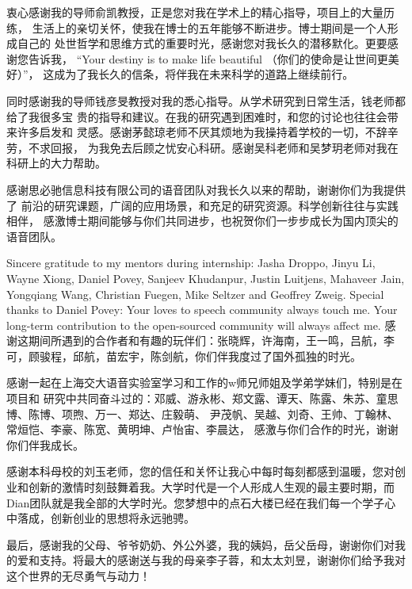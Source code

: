 \begin{thanks}

衷心感谢我的导师俞凯教授，正是您对我在学术上的精心指导，项目上的大量历练，
生活上的亲切关怀，使我在博士的五年能够不断进步。博士期间是一个人形成自己的
处世哲学和思维方式的重要时光，感谢您对我长久的潜移默化。更要感谢您告诉我， 
“Your destiny is to make life beautiful （你们的使命是让世间更美好）”， 
这成为了我长久的信条，将伴我在未来科学的道路上继续前行。

同时感谢我的导师钱彦旻教授对我的悉心指导。从学术研究到日常生活，钱老师都给了我很多宝
贵的指导和建议。在我的研究遇到困难时，和您的讨论也往往会带来许多启发和
灵感。感谢茅懿琼老师不厌其烦地为我操持着学校的一切，不辞辛劳，不求回报，
为我免去后顾之忧安心科研。感谢吴科老师和吴梦玥老师对我在科研上的大力帮助。

感谢思必驰信息科技有限公司的语音团队对我长久以来的帮助，谢谢你们为我提供了
前沿的研究课题，广阔的应用场景，和充足的研究资源。科学创新往往与实践相伴，
感激博士期间能够与你们共同进步，也祝贺你们一步步成长为国内顶尖的语音团队。

Sincere gratitude to my mentors during internship: Jasha Droppo, Jinyu Li, Wayne Xiong, Daniel
Povey, Sanjeev Khudanpur, Justin Luitjens, Mahaveer Jain, Yongqiang Wang, Christian Fuegen, Mike Seltzer and Geoffrey Zweig. Special thanks to Daniel Povey: Your loves to speech community always touch me. Your long-term contribution to the open-sourced community will always affect me. 感谢这期间所遇到的合作者和有趣的玩伴们：张晓辉，许海南，王一鸣，吕航，李可，顾骏程，邱航，苗宏宇，陈剑航，你们伴我度过了国外孤独的时光。

感谢一起在上海交大语音实验室学习和工作的w师兄师姐及学弟学妹们，特别是在项目和
研究中共同奋斗过的：邓威、游永彬、郑文露、谭天、陈露、朱苏、童思博、陈博、项煦、万一、郑达、庄毅萌、
尹茂帆、吴越、刘奇、王帅、丁翰林、常烜恺、李豪、陈宽、黄明坤、卢怡宙、李晨达，
感激与你们合作的时光，谢谢你们伴我成长。


感谢本科母校的刘玉老师，您的信任和关怀让我心中每时每刻都感到温暖，您对创业和创新的激情时刻鼓舞着我。大学时代是一个人形成人生观的最主要时期，而Dian团队就是我全部的大学时光。您梦想中的点石大楼已经在我们每一个学子心中落成，创新创业的思想将永远驰骋。

最后，感谢我的父母、爷爷奶奶、外公外婆，我的姨妈，岳父岳母，谢谢你们对我的爱和支持。将最大的感谢送与我的母亲李子蓉，和太太刘昱，谢谢你们给予我对这个世界的无尽勇气与动力！

\end{thanks}
